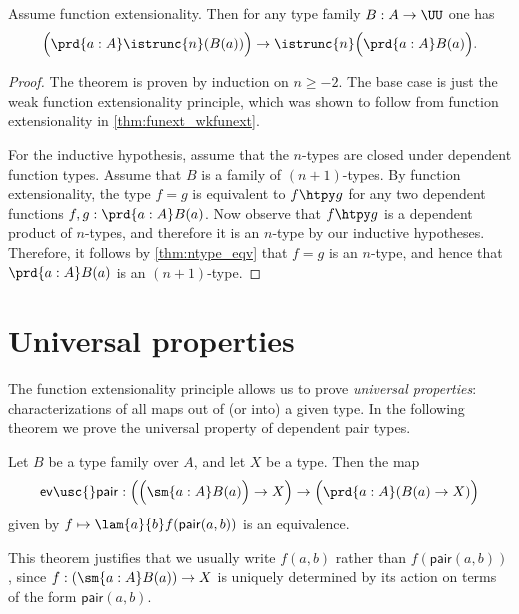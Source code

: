 \begin{thm}
Assume function extensionality. Then for any type family $B:A\to\UU$ one has
\begin{equation*}
\Big(\prd{a:A}\istrunc{n}(B(a))\Big)\to \istrunc{n}\Big(\prd{a:A}B(a)\Big).
\end{equation*}
\end{thm}

\begin{proof}
The theorem is proven by induction on $n\geq -2$. The base case is just the weak function extensionality principle, which was shown to follow from function extensionality in \autoref{thm:funext_wkfunext}.

For the inductive hypothesis, assume that the $n$-types are closed under dependent function types. Assume that $B$ is a family of $(n+1)$-types. By function extensionality, the type $f=g$ is equivalent to $f\htpy g$ for any two dependent functions $f,g:\prd{a:A}B(a)$. Now observe that $f\htpy g$ is a dependent product of $n$-types, and therefore it is an $n$-type by our inductive hypotheses. Therefore, it follows by \autoref{thm:ntype_eqv} that $f=g$ is an $n$-type, and hence that $\prd{a:A}B(a)$ is an $(n+1)$-type.
\end{proof}

\section{Universal properties}
The function extensionality principle allows us to prove \emph{universal properties}: characterizations of all maps out of (or into) a given type. In the following theorem we prove the universal property of dependent pair types.

\begin{thm}
Let $B$ be a type family over $A$, and let $X$ be a type. Then the map
\begin{equation*}
\mathsf{ev\usc{}pair}:\Big(\Big(\sm{a:A}B(a)\Big)\to X\Big)\to \Big(\prd{a:A}(B(a)\to X)\Big)
\end{equation*}
given by $f\mapsto\lam{a}{b}f(\mathsf{pair}(a,b))$ is an equivalence.
\end{thm}

This theorem justifies that we usually write $f(a,b)$ rather than $f(\mathsf{pair}(a,b))$, since $f:(\sm{a:A}B(a))\to X$ is uniquely determined by its action on terms of the form $\mathsf{pair}(a,b)$.

